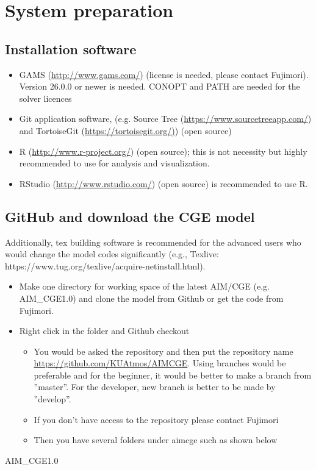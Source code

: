 \documentclass[10pt,a4paper,titlepage,dvipdfmx]{book}
\begin{document}
\section{\label{sec:StsPre}System preparation}

\subsection{\label{subsec:InsSof}Installation software}


\begin{itemize}
\item GAMS (\url{http://www.gams.com/}) (license is needed, please contact Fujimori). Version 26.0.0 or newer is needed. CONOPT and PATH are needed for the solver licences  
\item Git application software, (e.g. Source Tree (\url{https://www.sourcetreeapp.com/}) and TortoiseGit (\url{https://tortoisegit.org/)})  (open source)
\item R (\url{http://www.r-project.org/}) (open source); this is not necessity but highly recommended to use for analysis and visualization.
\item RStudio (\url{http://www.rstudio.com/}) (open source) is recommended to use R.
\end{itemize}
\subsection{\label{subsec:GitCGE}GitHub and download the CGE model}

Additionally, tex building software is recommended for the advanced users who would change the model codes significantly (e.g., Texlive: https://www.tug.org/texlive/acquire-netinstall.html).


\begin{itemize}
\item Make one directory for working space of the latest AIM/CGE (e.g. AIM\_CGE1.0) and clone the model from Github or get the code from Fujimori. 
\item Right click in the folder and Github checkout
\begin{itemize}
\item You would be asked the repository and then put the repository name \url{https://github.com/KUAtmos/AIMCGE}. Using branches would be preferable and for the beginner, it would be better to make a branch from ''master''. For the developer, new branch is better to be made by ''develop''.
\item If you don't have access to the repository please contact Fujimori
\item Then you have several folders under aimcge such as shown below
\end{itemize}

\end{itemize}
AIM\_CGE1.0
\end{document}
